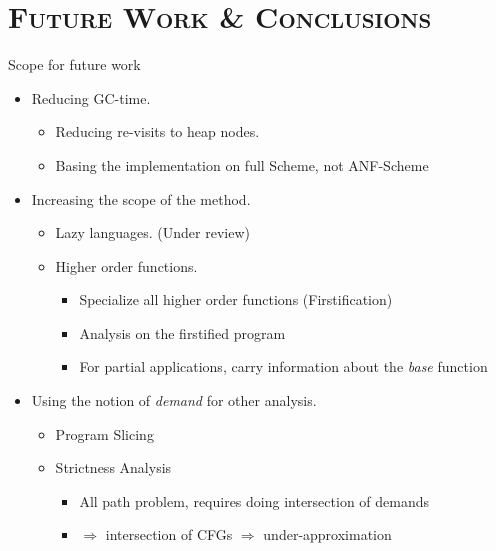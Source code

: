 \documentclass[xcolor=x11names,compress,mathserif]{beamer}
\renewcommand{\(}{\begin{columns}}
\renewcommand{\)}{\end{columns}}
\newcommand{\<}[1]{\begin{column}{#1}}
\renewcommand{\>}{\end{column}}
\begin{document}
\section{\scshape Future Work  \& Conclusions} 
\begin{frame}{Scope for future work}
\normalsize
\begin{itemize}\itemsep2em
\item<1-> Reducing GC-time.
  \begin{itemize}
  \item Reducing re-visits to heap nodes.
  \item Basing the implementation on full Scheme, not ANF-Scheme
  \end{itemize}
\item<2-> Increasing the scope of the method.
  \begin{itemize}
  \item Lazy languages. (Under review)
  \item Higher order functions.
    \begin{itemize}
    \item Specialize all higher order functions (Firstification)
    \item Analysis on the firstified program 
    \item For partial applications, carry information about the {\em base} function
\end{itemize}
  \end{itemize}
\item<3-> Using the notion of {\em demand} for other analysis.
  \begin{itemize}
  \item Program Slicing
  \item Strictness Analysis
    \begin{itemize}
    \item All path problem, requires doing intersection of demands 
    \item $\Rightarrow$ intersection of CFGs $\Rightarrow$ under-approximation
    \end{itemize}
  \end{itemize}
\end{itemize}
\end{frame}
\end{document}
